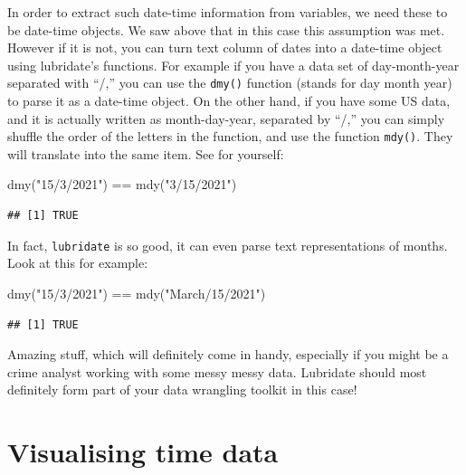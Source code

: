 \documentclass[
  krantz2]{krantz}
\makeatletter
\newenvironment{Shaded}{\begin{snugshade}}{\end{snugshade}}
\newcommand{\FunctionTok}[1]{\textcolor[rgb]{0,0,0}{#1}}
\newcommand{\NormalTok}[1]{#1}
\newcommand{\SpecialCharTok}[1]{\textcolor[rgb]{0,0,0}{#1}}
\newcommand{\StringTok}[1]{\textcolor[rgb]{0.5,0.5,0.5}{#1}}
\newenvironment{kframe}{%
\medskip{}
\setlength{\fboxsep}{.8em}
 \def\at@end@of@kframe{}%
 \ifinner\ifhmode%
  \def\at@end@of@kframe{\end{minipage}}%
  \begin{minipage}{\columnwidth}%
 \fi\fi%
 \def\FrameCommand##1{\hskip\@totalleftmargin \hskip-\fboxsep
 \colorbox{shadecolor}{##1}\hskip-\fboxsep
     \hskip-\linewidth \hskip-\@totalleftmargin \hskip\columnwidth}%
 \MakeFramed {\advance\hsize-\width
   \@totalleftmargin\z@ \linewidth\hsize
   \@setminipage}}%
 {\par\unskip\endMakeFramed%
 \at@end@of@kframe}
\renewenvironment{Shaded}{\begin{kframe}}{\end{kframe}}
\makeatother
\begin{document}
In order to extract such date-time information from variables, we need these to be date-time objects. We saw above that in this case this assumption was met. However if it is not, you can turn text column of dates into a date-time object using lubridate's functions. For example if you have a data set of day-month-year separated with ``/,'' you can use the \texttt{dmy()} function (stands for day month year) to parse it as a date-time object. On the other hand, if you have some US data, and it is actually written as month-day-year, separated by ``/,'' you can simply shuffle the order of the letters in the function, and use the function \texttt{mdy()}. They will translate into the same item. See for yourself:

\begin{Shaded}
\begin{Highlighting}[]
\FunctionTok{dmy}\NormalTok{(}\StringTok{"15/3/2021"}\NormalTok{) }\SpecialCharTok{==} \FunctionTok{mdy}\NormalTok{(}\StringTok{"3/15/2021"}\NormalTok{)}
\end{Highlighting}
\end{Shaded}

\begin{verbatim}
## [1] TRUE
\end{verbatim}

In fact, \texttt{lubridate} is so good, it can even parse text representations of months. Look at this for example:

\begin{Shaded}
\begin{Highlighting}[]
\FunctionTok{dmy}\NormalTok{(}\StringTok{"15/3/2021"}\NormalTok{) }\SpecialCharTok{==} \FunctionTok{mdy}\NormalTok{(}\StringTok{"March/15/2021"}\NormalTok{)}
\end{Highlighting}
\end{Shaded}

\begin{verbatim}
## [1] TRUE
\end{verbatim}

Amazing stuff, which will definitely come in handy, especially if you might be a crime analyst working with some messy messy data. Lubridate should most definitely form part of your data wrangling toolkit in this case!

\hypertarget{visualising-time-data}{%
\section{Visualising time data}\label{visualising-time-data}}
\end{document}
